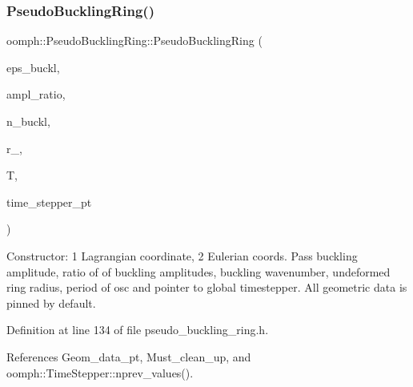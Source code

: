 \subsubsection{\texorpdfstring{Pseudo\+Buckling\+Ring()}{PseudoBucklingRing()}\hspace{0.1cm}{\footnotesize\ttfamily [3/5]}}
{\footnotesize\ttfamily oomph\+::\+Pseudo\+Buckling\+Ring\+::\+Pseudo\+Buckling\+Ring (\begin{DoxyParamCaption}\item[{const double \&}]{eps\+\_\+buckl,  }\item[{const double \&}]{ampl\+\_\+ratio,  }\item[{const unsigned}]{n\+\_\+buckl,  }\item[{const double \&}]{r\+\_,  }\item[{const double \&}]{T,  }\item[{\hyperlink{classoomph_1_1TimeStepper}{Time\+Stepper} $\ast$}]{time\+\_\+stepper\+\_\+pt }\end{DoxyParamCaption})\hspace{0.3cm}{\ttfamily [inline]}}



Constructor\+: 1 Lagrangian coordinate, 2 Eulerian coords. Pass buckling amplitude, ratio of of buckling amplitudes, buckling wavenumber, undeformed ring radius, period of osc and pointer to global timestepper. All geometric data is pinned by default. 



Definition at line 134 of file pseudo\+\_\+buckling\+\_\+ring.\+h.



References Geom\+\_\+data\+\_\+pt, Must\+\_\+clean\+\_\+up, and oomph\+::\+Time\+Stepper\+::nprev\+\_\+values().

\mbox{\label{classoomph_1_1PseudoBucklingRing_a68bb9ee9e3e2a37d78758b6f594e2369}} 
